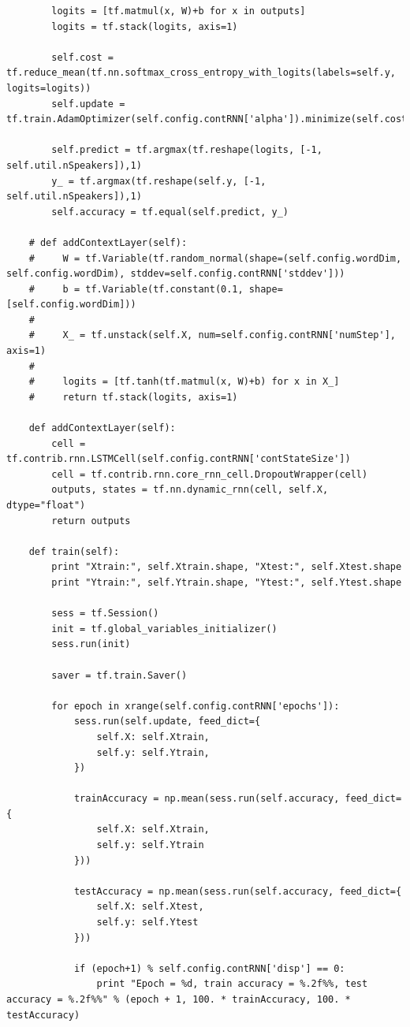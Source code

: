 \documentclass[BTech]{srmuthesis}
\begin{document}
\begin{verbatim}
        logits = [tf.matmul(x, W)+b for x in outputs]
        logits = tf.stack(logits, axis=1)

        self.cost = tf.reduce_mean(tf.nn.softmax_cross_entropy_with_logits(labels=self.y, logits=logits))
        self.update = tf.train.AdamOptimizer(self.config.contRNN['alpha']).minimize(self.cost)

        self.predict = tf.argmax(tf.reshape(logits, [-1, self.util.nSpeakers]),1)
        y_ = tf.argmax(tf.reshape(self.y, [-1, self.util.nSpeakers]),1)
        self.accuracy = tf.equal(self.predict, y_)

    # def addContextLayer(self):
    #     W = tf.Variable(tf.random_normal(shape=(self.config.wordDim, self.config.wordDim), stddev=self.config.contRNN['stddev']))
    #     b = tf.Variable(tf.constant(0.1, shape=[self.config.wordDim]))
    #
    #     X_ = tf.unstack(self.X, num=self.config.contRNN['numStep'], axis=1)
    #
    #     logits = [tf.tanh(tf.matmul(x, W)+b) for x in X_]
    #     return tf.stack(logits, axis=1)

    def addContextLayer(self):
        cell = tf.contrib.rnn.LSTMCell(self.config.contRNN['contStateSize'])
        cell = tf.contrib.rnn.core_rnn_cell.DropoutWrapper(cell)
        outputs, states = tf.nn.dynamic_rnn(cell, self.X, dtype="float")
        return outputs

    def train(self):
        print "Xtrain:", self.Xtrain.shape, "Xtest:", self.Xtest.shape
        print "Ytrain:", self.Ytrain.shape, "Ytest:", self.Ytest.shape

        sess = tf.Session()
        init = tf.global_variables_initializer()
        sess.run(init)

        saver = tf.train.Saver()

        for epoch in xrange(self.config.contRNN['epochs']):
            sess.run(self.update, feed_dict={
                self.X: self.Xtrain,
                self.y: self.Ytrain,
            })

            trainAccuracy = np.mean(sess.run(self.accuracy, feed_dict={
                self.X: self.Xtrain,
                self.y: self.Ytrain
            }))

            testAccuracy = np.mean(sess.run(self.accuracy, feed_dict={
                self.X: self.Xtest,
                self.y: self.Ytest
            }))

            if (epoch+1) % self.config.contRNN['disp'] == 0:
                print "Epoch = %d, train accuracy = %.2f%%, test accuracy = %.2f%%" % (epoch + 1, 100. * trainAccuracy, 100. * testAccuracy)


\end{verbatim}
\end{document}
